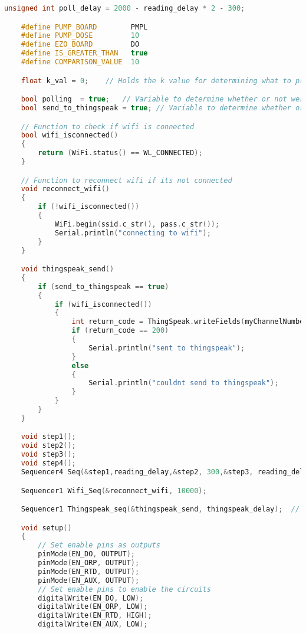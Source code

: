 \begin{lstlisting}[language=C++]
    unsigned int poll_delay = 2000 - reading_delay * 2 - 300;

    #define PUMP_BOARD        PMPL
    #define PUMP_DOSE         10
    #define EZO_BOARD         DO        
    #define IS_GREATER_THAN   true      
    #define COMPARISON_VALUE  10

    float k_val = 0;    // Holds the k value for determining what to print in the help menu

    bool polling  = true;   // Variable to determine whether or not were polling the circuits
    bool send_to_thingspeak = true; // Variable to determine whether or not were sending data to thingspeak

    // Function to check if wifi is connected
    bool wifi_isconnected() 
    {                           
        return (WiFi.status() == WL_CONNECTED);
    }

    // Function to reconnect wifi if its not connected
    void reconnect_wifi() 
    {                                   
        if (!wifi_isconnected()) 
        {
            WiFi.begin(ssid.c_str(), pass.c_str());
            Serial.println("connecting to wifi");
        }
    }

    void thingspeak_send() 
    {
        if (send_to_thingspeak == true) 
        {                                                    
            if (wifi_isconnected()) 
            {
                int return_code = ThingSpeak.writeFields(myChannelNumber, myWriteAPIKey);
                if (return_code == 200) 
                {
                    Serial.println("sent to thingspeak");
                } 
                else 
                {
                    Serial.println("couldnt send to thingspeak");
                }
            }
        }
    }

    void step1();
    void step2();
    void step3();
    void step4();
    Sequencer4 Seq(&step1,reading_delay,&step2, 300,&step3, reading_delay,&step4, poll_delay);

    Sequencer1 Wifi_Seq(&reconnect_wifi, 10000);

    Sequencer1 Thingspeak_seq(&thingspeak_send, thingspeak_delay);  // Sends data to thingspeak with the time determined by thingspeak delay

    void setup() 
    {
        // Set enable pins as outputs
        pinMode(EN_DO, OUTPUT);                                                         
        pinMode(EN_ORP, OUTPUT);
        pinMode(EN_RTD, OUTPUT);
        pinMode(EN_AUX, OUTPUT);
        // Set enable pins to enable the circuits
        digitalWrite(EN_DO, LOW);                
        digitalWrite(EN_ORP, LOW);
        digitalWrite(EN_RTD, HIGH);
        digitalWrite(EN_AUX, LOW);


\end{lstlisting}
